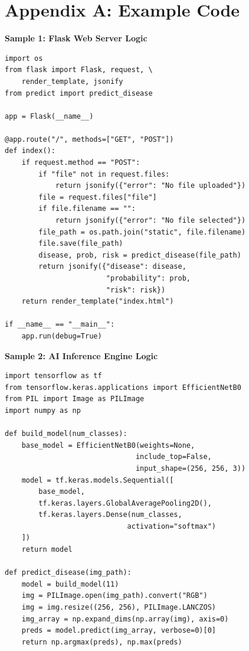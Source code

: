 \documentclass[conference]{IEEEtran}
\begin{document}
\newpage
\section*{Appendix A: Example Code}
\textbf{Sample 1: Flask Web Server Logic}
\begin{verbatim}
import os
from flask import Flask, request, \
    render_template, jsonify
from predict import predict_disease

app = Flask(__name__)

@app.route("/", methods=["GET", "POST"])
def index():
    if request.method == "POST":
        if "file" not in request.files:
            return jsonify({"error": "No file uploaded"})
        file = request.files["file"]
        if file.filename == "":
            return jsonify({"error": "No file selected"})
        file_path = os.path.join("static", file.filename)
        file.save(file_path)
        disease, prob, risk = predict_disease(file_path)
        return jsonify({"disease": disease, 
                        "probability": prob, 
                        "risk": risk})
    return render_template("index.html")

if __name__ == "__main__":
    app.run(debug=True)
\end{verbatim}

\vspace{0.5cm}

\textbf{Sample 2: AI Inference Engine Logic}
\begin{verbatim}
import tensorflow as tf
from tensorflow.keras.applications import EfficientNetB0
from PIL import Image as PILImage
import numpy as np

def build_model(num_classes):
    base_model = EfficientNetB0(weights=None, 
                               include_top=False, 
                               input_shape=(256, 256, 3))
    model = tf.keras.models.Sequential([
        base_model,
        tf.keras.layers.GlobalAveragePooling2D(),
        tf.keras.layers.Dense(num_classes, 
                             activation="softmax")
    ])
    return model

def predict_disease(img_path):
    model = build_model(11)
    img = PILImage.open(img_path).convert("RGB")
    img = img.resize((256, 256), PILImage.LANCZOS)
    img_array = np.expand_dims(np.array(img), axis=0)
    preds = model.predict(img_array, verbose=0)[0]
    return np.argmax(preds), np.max(preds)
\end{verbatim}
\end{document}
